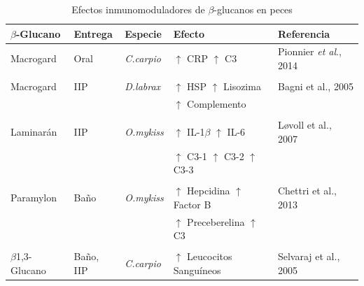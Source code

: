 \documentclass[12pt,letterpaper,oneside]{scrbook}
\begin{document}
\begin{table}[h!]
    \renewcommand{\arraystretch}{0.8}%
    \begin{center}
        \begin{threeparttable}
            \caption{Efectos inmunomoduladores de $\beta$-glucanos en peces}\label{tabla:glucanos}
            \begin{tabularx}{\textwidth}{l l l X l}
                \toprule
                $\beta$-Glucano & Entrega & Especie & Efecto & Referencia\\
                \midrule
                Macrogard                       &   Oral                & \emph{C.carpio}               & $\uparrow$ CRP $\uparrow$ C3                  & Pionnier \emph{et al}., 2014          \\
                & & & & \\
                Macrogard                       &   IIP                 & \emph{D.labrax}               & $\uparrow$ HSP $\uparrow$ Lisozima                    & Bagni et al., 2005            \\
                                                &                       &                               & $\uparrow$ Complemento            &                       \\
                & & & & \\
                Laminarán                       &   IIP                 & \emph{O.mykiss}               & $\uparrow$ IL-1$\beta$ $\uparrow$ IL-6            & Løvoll et al., 2007       \\
                                                &                       &                               & $\uparrow$ C3-1   $\uparrow$ C3-2 $\uparrow$ C3-3         &                       \\
                & & & & \\
                Paramylon                       &   Baño                & \emph{O.mykiss}               & $\uparrow$ Hepcidina  $\uparrow$ Factor B             & Chettri et al., 2013      \\  
                                                &                       &                               & $\uparrow$ Preceberelina $\uparrow$ C3            &                       \\
                & & & & \\
                $\beta$1,3-Glucano              &   Baño, IIP           & \emph{C.carpio}               & $\uparrow$ Leucocitos Sanguíneos  & Selvaraj et al., 2005         \\

\end{tabularx}
\end{threeparttable}
\end{center}
\end{table}
\end{document}
